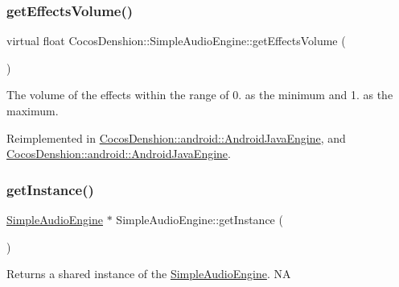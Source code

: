\subsubsection{\texorpdfstring{get\+Effects\+Volume()}{getEffectsVolume()}\hspace{0.1cm}{\footnotesize\ttfamily [2/2]}}
{\footnotesize\ttfamily virtual float Cocos\+Denshion\+::\+Simple\+Audio\+Engine\+::get\+Effects\+Volume (\begin{DoxyParamCaption}{ }\end{DoxyParamCaption})\hspace{0.3cm}{\ttfamily [virtual]}}

The volume of the effects within the range of 0. as the minimum and 1. as the maximum. 

Reimplemented in \hyperlink{classCocosDenshion_1_1android_1_1AndroidJavaEngine_aea7bc49b13e8823e9a64c9117d44fc09}{Cocos\+Denshion\+::android\+::\+Android\+Java\+Engine}, and \hyperlink{classCocosDenshion_1_1android_1_1AndroidJavaEngine_a21e1cc7de8f050587bbcf35e46add189}{Cocos\+Denshion\+::android\+::\+Android\+Java\+Engine}.

\mbox{\label{classCocosDenshion_1_1SimpleAudioEngine_a8e4d576d77c99f5f3f755fa374c36275}} 
\subsubsection{\texorpdfstring{get\+Instance()}{getInstance()}\hspace{0.1cm}{\footnotesize\ttfamily [1/2]}}
{\footnotesize\ttfamily \hyperlink{classCocosDenshion_1_1SimpleAudioEngine}{Simple\+Audio\+Engine} $\ast$ Simple\+Audio\+Engine\+::get\+Instance (\begin{DoxyParamCaption}{ }\end{DoxyParamCaption})\hspace{0.3cm}{\ttfamily [static]}}

Returns a shared instance of the \hyperlink{classCocosDenshion_1_1SimpleAudioEngine}{Simple\+Audio\+Engine}.  NA \mbox{\label{classCocosDenshion_1_1SimpleAudioEngine_a346acd6242af3094d9c3a42781047a46}} 
